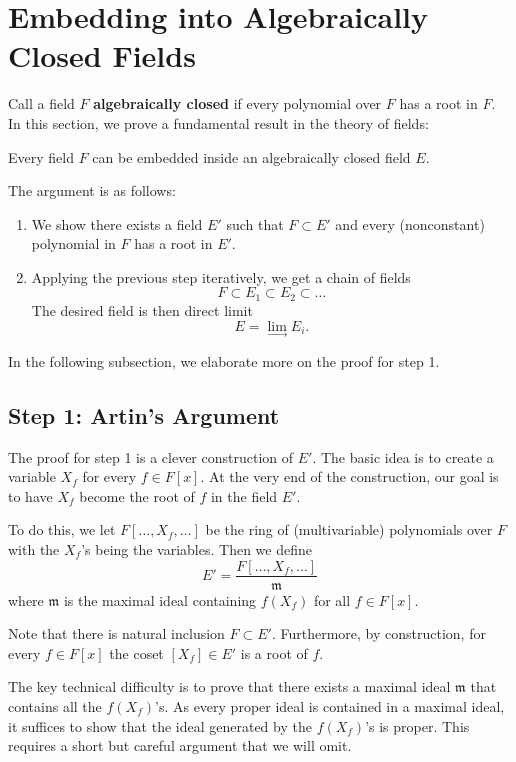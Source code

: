 \section{Embedding into Algebraically Closed Fields}
Call a field $F$ \textbf{algebraically closed} if every polynomial over $F$ has a root in $F$. In this section, we prove a fundamental result in the theory of fields:
\begin{center}
    Every field $F$ can be embedded inside an algebraically closed field $E$.
\end{center}
The argument is as follows:
\begin{enumerate}
    \item We show there exists a field $E'$ such that $F \subset E'$ and every (nonconstant) polynomial in $F$ has a root in $E'$.

    \item Applying the previous step iteratively, we get a chain of fields
        \[
            F \subset E_1 \subset E_2 \subset \dots
        \]
        The desired field is then direct limit
        \[
            E = \lim_{\longrightarrow} E_i.
        \]
\end{enumerate}
In the following subsection, we elaborate more on the proof for step 1.

\subsection{Step 1: Artin's Argument}
The proof for step 1 is a clever construction of $E'$. The basic idea is to create a variable $X_f$ for every $f \in F[x]$. At the very end of the construction, our goal is to have $X_f$ become the root of $f$ in the field $E'$.

To do this, we let $F[\dots, X_f, \dots]$ be the ring of (multivariable) polynomials over $F$ with the $X_f$'s being the variables. Then we define
\[
    E' = \frac{F[\dots, X_f, \dots]}{\mathfrak m}
\]
where $\mathfrak m$ is the maximal ideal containing $f(X_f)$ for all $f \in F[x]$.

Note that there is natural inclusion $F \subset E'$. Furthermore, by construction, for every $f \in F[x]$ the coset $[X_f] \in E'$ is a root of $f$.

The key technical difficulty is to prove that there exists a maximal ideal $\mathfrak m$ that contains all the $f(X_f)$'s. As every proper ideal is contained in a maximal ideal, it suffices to show that the ideal generated by the $f(X_f)$'s is proper. This requires a short but careful argument that we will omit.
